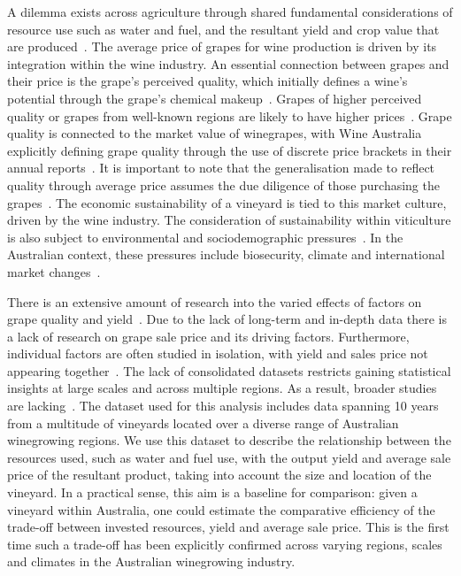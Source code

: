 \documentclass[10pt,letterpaper]{article}
\begin{document}
A dilemma exists across agriculture through shared fundamental considerations of resource use such as water and fuel, and the resultant yield and crop value that are produced~\cite{hemmingCherryTomatoProduction2020,kawasakiQualityMattersMore2016, zhuEffectsNitrogenLevel2017}. The average price of grapes for wine production is driven by its integration within the wine industry. An essential connection between grapes and their price is the grape's perceived quality, which initially defines a wine's potential through the grape's chemical makeup~\cite{blackTerpenoidsTheirRole2015,schreierFlavorCompositionWines1979}. Grapes of higher perceived quality or grapes from well-known regions are likely to have higher prices~\cite{wineaustraliaNationalVintageReport2021}. Grape quality is connected to the market value of winegrapes, with Wine Australia explicitly defining grape quality through the use of discrete price brackets in their annual reports~\cite{winemakersfederationofaustraliaNationalVintageReport2018}. It is important to note that the generalisation made to reflect quality through average price assumes the due diligence of those purchasing the grapes~\cite{yeggeInfluenceSensoryNonsensory2001}. The economic sustainability of a vineyard is tied to this market culture, driven by the wine industry. The consideration of sustainability within viticulture is also subject to environmental and sociodemographic pressures~\cite{santiago-brownSustainabilityAssessmentWineGrape2015}. In the Australian context, these pressures include biosecurity, climate and international market changes~\cite{canadellMultidecadalIncreaseForest2021,longbottomRoleVineyardPractices2015,oliverReviewSoilPhysical2013}.
\par
There is an extensive amount of research into the varied effects of factors on grape quality and yield~\cite{heFruitYieldPrediction2022,laurentLocalInfluenceClimate2022,liakosMachineLearningAgriculture2018}. Due to the lack of long-term and in-depth data there is a lack of research on grape sale price and its driving factors. Furthermore, individual factors are often studied in isolation, with yield and sales price not appearing together~\cite{abbalDecisionSupportSystem2016}. The lack of consolidated datasets restricts gaining statistical insights at large scales and across multiple regions. As a result, broader studies are lacking~\cite{keithjonesAustralianWineIndustry2002,knightFirmResourcesDevelopment2019}. The dataset used for this analysis includes data spanning 10 years from a multitude of vineyards located over a diverse range of Australian winegrowing regions. We use this dataset to describe the relationship between the resources used, such as water and fuel use, with the output yield and average sale price of the resultant product, taking into account the size and location of the vineyard. In a practical sense, this aim is a baseline for comparison: given a vineyard within Australia, one could estimate the comparative efficiency of the trade-off between invested resources, yield and average sale price. This is the first time such a trade-off has been explicitly confirmed across varying regions, scales and climates in the Australian winegrowing industry.
\end{document}
